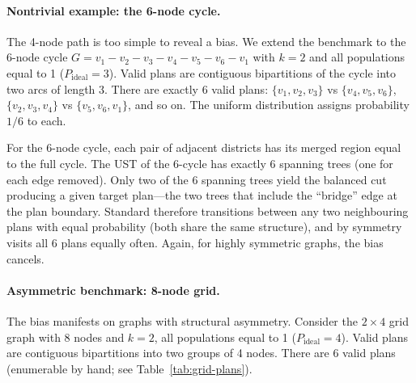 \paragraph{Nontrivial example: the 6-node cycle.}
The 4-node path is too simple to reveal a bias.
We extend the benchmark to the 6-node cycle $G = v_1 - v_2 - v_3 - v_4 - v_5 - v_6 - v_1$
with $k = 2$ and all populations equal to 1 ($P_{\mathrm{ideal}} = 3$).
Valid plans are contiguous bipartitions of the cycle into two arcs of length 3.
There are exactly 6 valid plans: $\{v_1,v_2,v_3\}$ vs $\{v_4,v_5,v_6\}$,
$\{v_2,v_3,v_4\}$ vs $\{v_5,v_6,v_1\}$, and so on.
The uniform distribution assigns probability $1/6$ to each.

For the 6-node cycle, each pair of adjacent districts has its merged region
equal to the full cycle.
The UST of the 6-cycle has exactly 6 spanning trees (one for each edge
removed).
Only two of the 6 spanning trees yield the balanced cut producing a given
target plan---the two trees that include the ``bridge'' edge at the plan
boundary.
Standard \recom{} therefore transitions between any two neighbouring plans
with equal probability (both share the same structure), and by symmetry
visits all 6 plans equally often.
Again, for highly symmetric graphs, the bias cancels.

\paragraph{Asymmetric benchmark: 8-node grid.}
The bias manifests on graphs with structural asymmetry.
Consider the $2 \times 4$ grid graph with 8 nodes and $k = 2$, all populations
equal to 1 ($P_{\mathrm{ideal}} = 4$).
Valid plans are contiguous bipartitions into two groups of 4 nodes.
There are 6 valid plans (enumerable by hand; see Table~\ref{tab:grid-plans}).


